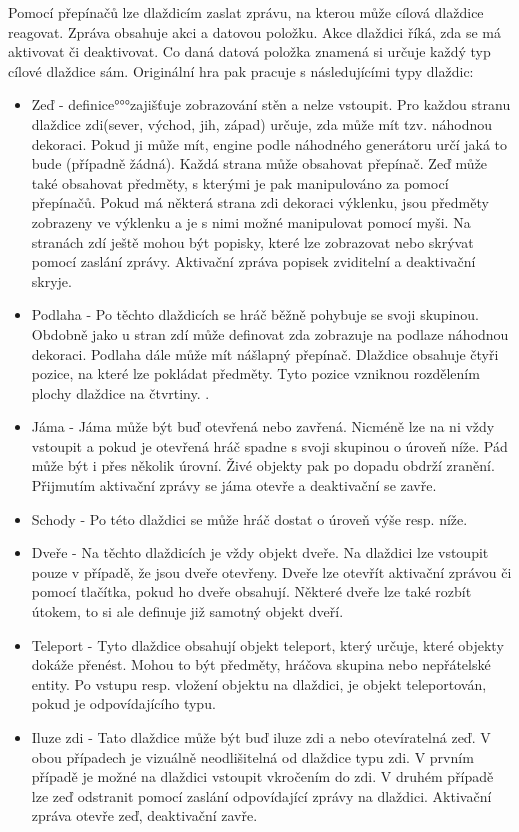 Pomocí přepínačů lze dlaždicím zaslat zprávu, na kterou může cílová dlaždice reagovat. Zpráva obsahuje akci a datovou položku. 
Akce dlaždici říká, zda se má aktivovat či deaktivovat. Co daná datová položka znamená si určuje každý typ cílové dlaždice sám. 
Originální hra pak pracuje s následujícími typy dlaždic:
\begin{itemize}
\item Zeď - definice°°°zajišťuje zobrazování stěn a nelze vstoupit. Pro každou stranu dlaždice zdi(sever, východ, jih, západ)
	určuje, zda může mít tzv. náhodnou dekoraci. Pokud ji může mít, engine podle náhodného generátoru
	určí jaká to bude (případně žádná). Každá strana může obsahovat přepínač.  Zeď může také obsahovat předměty, s kterými je pak 
	manipulováno za pomocí přepínačů. Pokud má některá strana zdi dekoraci výklenku, jsou předměty zobrazeny ve 
	výklenku a je s nimi možné manipulovat pomocí myši. Na stranách zdí ještě mohou být popisky, které lze zobrazovat nebo 
	skrývat pomocí zaslání zprávy. Aktivační zpráva popisek zviditelní a deaktivační skryje.

\item Podlaha - Po těchto dlaždicích se hráč běžně pohybuje se svoji skupinou. Obdobně jako u stran zdí může definovat
	zda zobrazuje na podlaze náhodnou dekoraci. Podlaha dále může mít nášlapný přepínač. Dlaždice obsahuje čtyři pozice,
	na které lze pokládat předměty. Tyto pozice vzniknou rozdělením plochy dlaždice na čtvrtiny. .

\item Jáma - Jáma může být buď otevřená nebo zavřená. Nicméně lze na ni vždy vstoupit a pokud je otevřená 
	hráč spadne s svoji skupinou o úroveň níže. Pád může být i přes několik úrovní. Živé objekty pak po
	dopadu obdrží zranění. Přijmutím aktivační zprávy se jáma otevře a deaktivační se zavře.

\item Schody - Po této dlaždici se může hráč dostat o úroveň výše resp. níže.

\item Dveře - Na těchto dlaždicích je vždy objekt dveře. Na dlaždici lze vstoupit pouze v případě, že jsou dveře
	otevřeny. Dveře lze otevřít aktivační zprávou či pomocí tlačítka, pokud ho dveře obsahují. 
	Některé dveře lze také rozbít útokem, to si ale definuje již samotný objekt dveří.

\item Teleport - Tyto dlaždice obsahují objekt teleport, který určuje, které objekty dokáže přenést. Mohou to být
	předměty, hráčova skupina nebo nepřátelské entity. Po vstupu resp. vložení objektu na dlaždici, je objekt teleportován, pokud
	je odpovídajícího typu.

\item Iluze zdi - Tato dlaždice může být buď iluze zdi a nebo otevíratelná zeď. V obou případech je vizuálně neodlišitelná
	od dlaždice typu zdi. V prvním případě je možné na dlaždici vstoupit vkročením do zdi. V druhém případě lze
	zeď odstranit pomocí zaslání odpovídající zprávy na dlaždici. Aktivační zpráva otevře zeď, deaktivační zavře.
\end{itemize}

